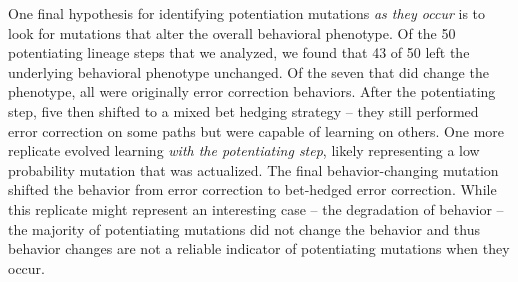 One final hypothesis for identifying potentiation mutations \textit{as they occur} is to look for mutations that alter the overall behavioral phenotype. 
Of the 50 potentiating lineage steps that we analyzed, we found that 43 of 50 left the underlying behavioral phenotype unchanged. 
Of the seven that did change the phenotype, all were originally error correction behaviors. 
After the potentiating step, five then shifted to a mixed bet hedging strategy -- they still performed error correction on some paths but were capable of learning on others. 
One more replicate evolved learning \textit{with the potentiating step}, likely representing a low probability mutation that was actualized. 
The final behavior-changing mutation shifted the behavior from error correction to bet-hedged error correction. 
While this replicate might represent an interesting case -- the degradation of behavior -- the majority of potentiating mutations did not change the behavior and thus behavior changes are not a reliable indicator of potentiating mutations when they occur. 